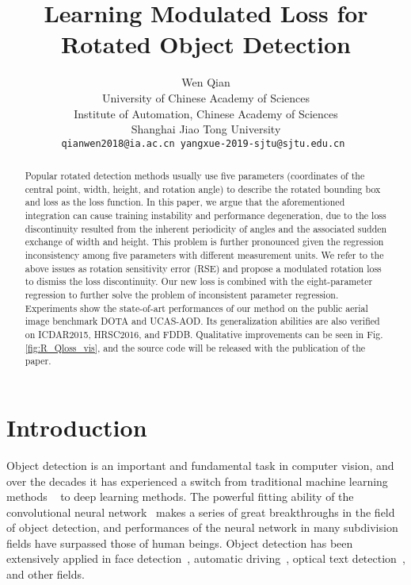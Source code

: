 \documentclass[10pt,twocolumn,letterpaper]{article}
\begin{document}
\title{Learning Modulated Loss for Rotated Object Detection}

\author{Wen Qian    \\
University of Chinese Academy of Sciences\\
Institute of Automation, Chinese Academy of Sciences\\
Shanghai Jiao Tong University \\
{\tt qianwen2018@ia.ac.cn \quad yangxue-2019-sjtu@sjtu.edu.cn
}
}

\maketitle


\begin{abstract}
     Popular rotated detection methods usually use five parameters (coordinates of the central point, width, height, and rotation angle) to describe the rotated bounding box and  loss as the loss function. In this paper, we argue that the aforementioned integration can cause training instability and performance degeneration, due to the loss discontinuity resulted from the inherent periodicity of angles and the associated sudden exchange of width and height. This problem is further pronounced given the regression inconsistency among five parameters with different measurement units. We refer to the above issues as rotation sensitivity error (RSE) and propose a modulated rotation loss to dismiss the loss discontinuity. Our new loss is combined with the eight-parameter regression to further solve the problem of inconsistent parameter regression. Experiments show the state-of-art performances of our method on the public aerial image benchmark DOTA and UCAS-AOD. Its generalization abilities are also verified on ICDAR2015, HRSC2016, and FDDB. Qualitative improvements can be seen in Fig. \ref{fig:R_Qloss_vis}, and the source code will be released with the publication of the paper.
\end{abstract}

\section{Introduction}\label{sec:intro}
Object detection is an important and fundamental task in computer vision, and over the decades it has experienced a switch from traditional machine learning methods ~\cite{R1_viola2001rapid,R2_lienhart2002extended,R3_shotton2008multiscale,R4_lindeberg2012scale} to deep learning methods. The powerful fitting ability of the convolutional neural network~\cite{R5_Krizhevsky2012ImageNet} makes a series of great breakthroughs in the field of object detection, and performances of the neural network in many subdivision fields have surpassed those of human beings. Object detection has been extensively applied in face detection~\cite{R6_Zhang2017FaceBoxes,R7_Zhang2016Joint}, automatic driving~\cite{R8_Bagschik2017Ontology}, optical text detection~\cite{R9_Liao2016TextBoxes}, and other fields.
\end{document}
